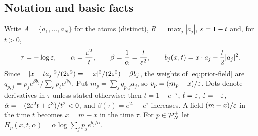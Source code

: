 \documentclass{article} %
\theoremstyle{plain}
\theoremstyle{definition}
\theoremstyle{remark}
\begin{document}
\subsection{Notation and basic facts}
\label{apx:intervention-notation}

Write $A=\{a_1,\dots,a_N\}$ for the atoms (distinct), $R=\max_j|a_j|$, $\varepsilon=1-t$ and, for $t>0$,
\[
\tau=-\log\varepsilon,\qquad \alpha=\frac{\varepsilon^2}{t},\qquad \beta=\frac1\alpha=\frac{t}{\varepsilon^2},
\qquad b_j(x,t)=x\cdot a_j-\frac t2|a_j|^2 .
\]
Since $-|x-ta_j|^2/(2\varepsilon^2)=-|x|^2/(2\varepsilon^2)+\beta b_j$, the weights of \eqref{eq:prior-field}
are $q_{p,j}=p_je^{\beta b_j}/\sum_\ell p_\ell e^{\beta b_\ell}$. Put $m_p=\sum_jq_{p,j}a_j$, so
$v_p=(m_p-x)/\varepsilon$. Dots denote derivatives in $\tau$ unless stated otherwise; then
$t=1-e^{-\tau}$, $\dot t=\varepsilon$, $\dot{\varepsilon}=-\varepsilon$, $\dot\alpha=-(2\varepsilon^2t+\varepsilon^3)/t^2<0$, and
$\beta(\tau)=e^{2\tau}-e^\tau$ increases. A field $(m-x)/\varepsilon$ in the time $t$ becomes
$\dot x=m-x$ in the time $\tau$. For $p\in\mathcal{P}_N^{+}$ let $H_p(x,t,\alpha)=\alpha\log\sum_jp_je^{b_j/\alpha}$.
\end{document}
